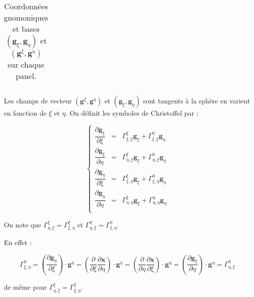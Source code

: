 \begin{table}[htbp]
\begin{center}
\begin{tabular}{|c|c|c|}
\end{tabular}
\end{center}
\caption{Coordonnées gnomoniques et bases $\left( \mathbf{g}_{\xi}, \mathbf{g}_{\eta} \right)$ et $\left( \mathbf{g}^{\xi}, \mathbf{g}^{\eta} \right)$ sur chaque panel.}
\label{tab: base g_xi g_eta}
\end{table}












Les champs de vecteur $( \mathbf{g}^{\xi}, \mathbf{g}^{\eta})$ et $( \mathbf{g}_ {\xi}, \mathbf{g}_{\eta})$ sont tangents à la sphère en varient en fonction de $\xi$ et $\eta$. On définit les symboles de Christoffel par :

\begin{equation}
\left\lbrace
\begin{array}{rcl}
\dfrac{\partial \mathbf{g}_{\xi}}{\partial \xi} & = & \Gamma_{\xi,\xi}^{\xi} \mathbf{g}_{\xi} + \Gamma_{\xi,\xi}^{\eta} \mathbf{g}_{\eta}\\

\dfrac{\partial \mathbf{g}_{\xi}}{\partial \eta} & = & \Gamma_{\eta,\xi}^{\xi} \mathbf{g}_{\xi} + \Gamma_{\eta,\xi}^{\eta} \mathbf{g}_{\eta}\\

\dfrac{\partial \mathbf{g}_{\eta}}{\partial \xi} & = & \Gamma_{\xi,\eta}^{\xi} \mathbf{g}_{\xi} + \Gamma_{\xi,\eta}^{\eta} \mathbf{g}_{\eta}\\

\dfrac{\partial \mathbf{g}_{\eta}}{\partial \eta} & = & \Gamma_{\eta,\eta}^{\xi} \mathbf{g}_{\xi} + \Gamma_{\eta,\eta}^{\eta} \mathbf{g}_{\eta}\\
\end{array}
\right.
\end{equation}

\begin{remarque}
On note que $\Gamma_{\eta,\xi}^{\xi}=\Gamma_{\xi,\eta}^{\xi}$ et $\Gamma_{\eta,\xi}^{\eta}=\Gamma_{\xi,\eta}^{\eta}$.

En effet :

$$\Gamma_{\xi, \eta}^{\eta} = \left( \dfrac{\partial \mathbf{g}_{\eta}}{\partial \xi} \right) \cdot \mathbf{g}^{\eta} = \left( \dfrac{\partial}{\partial \xi} \dfrac{\partial \mathbf{x}}{\partial \eta} \right) \cdot \mathbf{g}^{\eta} = \left( \dfrac{\partial}{\partial \eta} \dfrac{\partial \mathbf{x}}{\partial \xi} \right) \cdot \mathbf{g}^{\eta} = \left( \dfrac{\partial \mathbf{g}_{\xi}}{\partial \eta} \right) \cdot \mathbf{g}^{\eta} = \Gamma_{\eta, \xi}^{\eta}$$

de même pour $\Gamma_{\eta,\xi}^{\xi}=\Gamma_{\xi,\eta}^{\xi}$.
\end{remarque}




